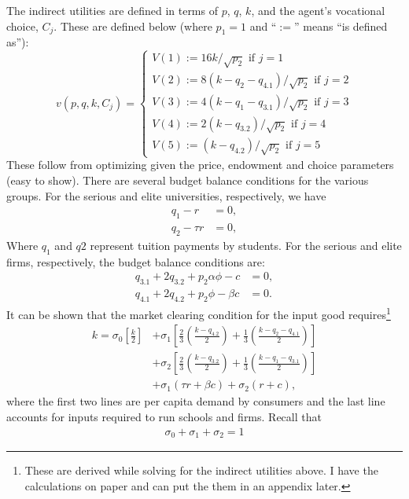 \documentclass[12pt,letterpaper]{article}
\begin{document}
	The indirect utilities are defined in terms of $p$, $q$, $k$, and the agent's vocational choice, $C_j$. 
	These are defined below (where $p_1=1$ and ``$:=$'' means ``is defined as''):
	\[
	v(p,q,k,C_j) = \begin{cases}
		V(1):=16k/\sqrt{p_2}\text{ if }j=1\\
		V(2):=8(k-q_2-q_{4.1})/\sqrt{p_2}\text{ if }j=2\\
		V(3):=4(k-q_1-q_{3.1})/\sqrt{p_2}\text{ if }j=3\\
		V(4):=2(k-q_{3.2})/\sqrt{p_2}\text{ if }j=4\\
		V(5):=(k-q_{4.2})/\sqrt{p_2}\text{ if }j=5
	\end{cases}
	\]
	These follow from optimizing given the price, endowment and choice parameters (easy to show).
	There are several budget balance conditions for the various groups.
	For the serious and elite universities, respectively, we have
	\begin{align}
		q_1-r&=0,\label{Eq:u-balance1}\\
		q_2-\tau r&=0,\label{Eq:u-balance2}
	\end{align}
	Where $q_1$ and $q2$ represent tuition payments by students.
	For the serious and elite firms, respectively, the budget balance conditions are:
	\begin{align}
		q_{3.1}+2q_{3.2}+p_2\alpha\phi-c&=0,\label{Eq:f-balance1}\\
		q_{4.1}+2q_{4.2}+p_2\phi-\beta c&=0.\label{Eq:f-balance2}
	\end{align}
	It can be shown that the market clearing condition for the input good requires\footnote
	{
		These are derived while solving for the indirect utilities above. I have the calculations on paper and can put the them in an appendix later.
	}
	\begin{align*}
	k=\sigma_0\left[\frac{k}{2}\right] 
	&+ \sigma_1
	\left[
		\frac{2}{3}\left(\frac{k-q_{4.2}}{2}\right)
		+\frac{1}{3}\left(\frac{k-q_2-q_{4.1}}{2}\right)
	\right]\\
	&+ \sigma_2
	\left[
		\frac{2}{3}\left(\frac{k-q_{3.2}}{2}\right)
		+\frac{1}{3}\left(\frac{k-q_1-q_{3.1}}{2}\right)
	\right]\\
	&+
	\sigma_1(\tau r+\beta c) + \sigma_2(r+c),
	\end{align*}
	where the first two lines are per capita demand by consumers and the last line accounts for inputs required to run schools and firms.
	Recall that
	\begin{align}\label{eq:sumsigmas}
		\sigma_0+\sigma_1+\sigma_2=1
	\end{align} 
	
\end{document}
